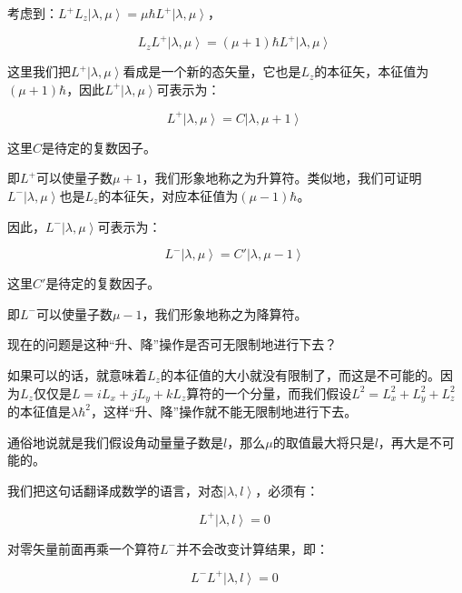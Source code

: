 考虑到：$L^+ L_z \left| \lambda, \mu \right\rangle = \mu \hbar L^+ \left| \lambda, \mu \right\rangle $，

\begin{equation}
L_z L^+ \left| \lambda, \mu \right\rangle = (\mu + 1) \hbar L^+ \left| \lambda, \mu \right\rangle~
\end{equation}

这里我们把$L^+ \left| \lambda, \mu \right\rangle$看成是一个新的态矢量，它也是$L_z$的本征矢，本征值为$( \mu + 1 ) \hbar$，因此$L^+ \left| \lambda, \mu \right\rangle$可表示为：

\begin{equation}
L^+ \left| \lambda, \mu \right\rangle = C \left| \lambda, \mu+1 \right\rangle~
\end{equation}

这里$C$是待定的复数因子。

即$L^+$可以使量子数$\mu+1$，我们形象地称之为升算符。类似地，我们可证明$L^- \left| \lambda, \mu \right\rangle $也是$L_z$的本征矢，对应本征值为$(\mu-1) \hbar$。

因此，$L^- \left| \lambda, \mu \right\rangle$可表示为：

\begin{equation}
L^- \left| \lambda, \mu \right\rangle = C' \left| \lambda, \mu-1 \right\rangle~
\end{equation}

这里$C'$是待定的复数因子。

即$L^-$可以使量子数$\mu-1$，我们形象地称之为降算符。

现在的问题是这种“升、降”操作是否可无限制地进行下去？

如果可以的话，就意味着$L_z$的本征值的大小就没有限制了，而这是不可能的。因为$L_z$仅仅是$L = i L_x + j L_y + k L_z$算符的一个分量，而我们假设$L^2 = L_x^2 + L_y^2 + L_z^2$的本征值是$\lambda \hbar^2$，这样“升、降”操作就不能无限制地进行下去。

通俗地说就是我们假设角动量量子数是$l$，那么$\mu$的取值最大将只是$l$，再大是不可能的。

我们把这句话翻译成数学的语言，对态$\left| \lambda, l \right\rangle$，必须有：

\begin{equation}
L^+ \left| \lambda, l \right\rangle = 0~
\end{equation}

对零矢量前面再乘一个算符$L^-$并不会改变计算结果，即：

\begin{equation}
L^- L^+ \left| \lambda, l \right\rangle = 0 ~
\end{equation}

